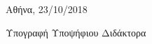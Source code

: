 \documentclass[a4paper]{article}
\begin{document}



\vspace{1em}

\begin{center}
  Αθήνα, 23/10/2018

  \vspace{4em}

  Υπογραφή Υποψήφιου Διδάκτορα
\end{center}
\end{document}
